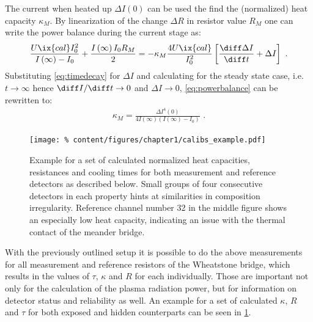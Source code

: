                 The current when heated up $\Delta I\left(0\right)$ can be used the find the (normalized) heat capacity $\kappa_{M}$. By linearization of the change $\Delta R$ in resistor value $R_{M}$ one can write the power balance during the current stage as:%
%
                \begin{align}%
                    \begin{split}\label{eq:powerbalance}%
                        \frac{U\ix{cal}I^{2}_{0}}{I\left(\infty\right)-I_{0}}+\frac{I\left(\infty\right)I_{0}R_{M}}{2}=-\kappa_{M}\frac{4U\ix{cal}}{I^{2}_{0}}\left[\frac{\diff\Delta I}{\diff t}+\Delta I\right]\,\,.%
                    \end{split}%
                \end{align}%
%
                Substituting \cref{eq:timedecay} for $\Delta I$ and calculating for the steady state case, i.e. $t\rightarrow\infty$ hence $\diff I/\diff t\rightarrow 0$ and $\Delta I\rightarrow 0$, \cref{eq:powerbalance} can be rewritten to:%
%
                \begin{align}%
                    \kappa_{M}=\frac{\Delta I^{4}\left(0\right)}{4I\left(\infty\right)\left(I\left(\infty\right)-I_{0}\right)}\,\,.\label{eq:heatcapacity}%
                \end{align}%
%
                \begin{figure}[t]%
                    \centering%
                    \texttt{[image: \%
                        content/figures/chapter1/calibs\_example.pdf]}
                    \caption{Example for a set of calculated normalized heat capacities, resistances and cooling times for both measurement and reference detectors as described below. Small groups of four consecutive detectors in each property hints at similarities in composition irregularity. Reference channel number 32 in the middle figure shows an especially low heat capacity, indicating an issue with the thermal contact of the meander bridge.}\label{fig:calibsexample}%
                \end{figure}%
%
                With the previously outlined setup it is possible to do the above measurements for all measurement and reference resistors of the Wheatstone bridge, which results in the values of $\tau$, $\kappa$ and $R$ for each individually. Those are important not only for the calculation of the plasma radiation power, but for information on detector status and reliability as well. An example for a set of calculated $\kappa$, $R$ and $\tau$ for both exposed and hidden counterparts can be seen in \cref{fig:calibsexample}.\\%
